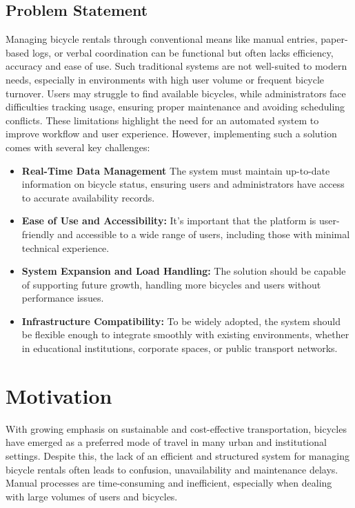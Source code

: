 \subsection{Problem Statement} Managing bicycle rentals through conventional means like manual entries, paper-based logs, or verbal coordination can be functional but often lacks efficiency, accuracy and ease of use. Such traditional systems are not well-suited to modern needs, especially in environments with high user volume or frequent bicycle turnover. Users may struggle to find available bicycles, while administrators face difficulties tracking usage, ensuring proper maintenance and avoiding scheduling conflicts. These limitations highlight the need for an automated system to improve workflow and user experience. However, implementing such a solution comes with several key challenges:
\begin{itemize}
    \item \textbf{Real-Time Data Management} The system must maintain up-to-date information on bicycle status, ensuring users and administrators have access to accurate availability records.
    \item \textbf{Ease of Use and Accessibility:} It’s important that the platform is user-friendly and accessible to a wide range of users, including those with minimal technical experience.
    \item \textbf{System Expansion and Load Handling:} The solution should be capable of supporting future growth, handling more bicycles and users without performance issues.
    \item \textbf{Infrastructure Compatibility:} To be widely adopted, the system should be flexible enough to integrate smoothly with existing environments, whether in educational institutions, corporate spaces, or public transport networks.\cite{1.1.1}\\

\end{itemize}

\section{Motivation}
With growing emphasis on sustainable and cost-effective transportation, bicycles have emerged as a preferred mode of travel in many urban and institutional settings. Despite this, the lack of an efficient and structured system for managing bicycle rentals often leads to confusion, unavailability and maintenance delays. Manual processes are time-consuming and inefficient, especially when dealing with large volumes of users and bicycles.\\

